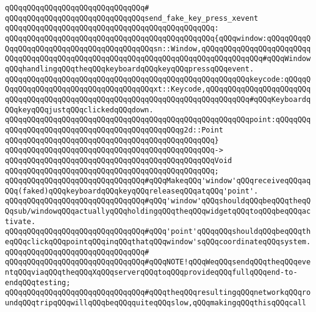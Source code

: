\verb|qQQqqQQqqQQqqQQqqQQqqQQqqQQqqQQq#|\newline
\verb|qQQqqQQqqQQqqQQqqQQqqQQqqQQqqQQqsend_fake_key_press_xevent|\newline
\verb|qQQqqQQqqQQqqQQqqQQqqQQqqQQqqQQqqQQqqQQqqQQqqQQq:|\newline
\verb|qQQqqQQqqQQqqQQqqQQqqQQqqQQqqQQqqQQqqQQqqQQqqQQq{qQQqwindow:qQQqqQQqqQQqqQQqqQQqqQQqqQQqqQQqqQQqqQQqqQQqsn::Window,qQQqqQQqqQQqqQQqqQQqqQQqqQQqqQQqqQQqqQQqqQQqqQQqqQQqqQQqqQQqqQQqqQQqqQQqqQQqqQQqqQQq#qQQqWindowqQQqhandlingqQQqtheqQQqkeyboardqQQqkeyqQQqpressqQQqevent.|\newline
\verb|qQQqqQQqqQQqqQQqqQQqqQQqqQQqqQQqqQQqqQQqqQQqqQQqqQQqqQQqkeycode:qQQqqQQqqQQqqQQqqQQqqQQqqQQqqQQqqQQqqQQqxt::Keycode,qQQqqQQqqQQqqQQqqQQqqQQqqQQqqQQqqQQqqQQqqQQqqQQqqQQqqQQqqQQqqQQqqQQqqQQqqQQqqQQq#qQQqKeyboardqQQqkeyqQQqjustqQQqclickedqQQqdown.|\newline
\verb|qQQqqQQqqQQqqQQqqQQqqQQqqQQqqQQqqQQqqQQqqQQqqQQqqQQqqQQqpoint:qQQqqQQqqQQqqQQqqQQqqQQqqQQqqQQqqQQqqQQqqQQqqQQqg2d::Point|\newline
\verb|qQQqqQQqqQQqqQQqqQQqqQQqqQQqqQQqqQQqqQQqqQQqqQQq}|\newline
\verb|qQQqqQQqqQQqqQQqqQQqqQQqqQQqqQQqqQQqqQQqqQQqqQQq->|\newline
\verb|qQQqqQQqqQQqqQQqqQQqqQQqqQQqqQQqqQQqqQQqqQQqqQQqVoid|\newline
\verb|qQQqqQQqqQQqqQQqqQQqqQQqqQQqqQQqqQQqqQQqqQQqqQQq;|\newline
\newline
\verb|qQQqqQQqqQQqqQQqqQQqqQQqqQQqqQQq#qQQqMakeqQQq'window'qQQqreceiveqQQqaqQQq(faked)qQQqkeyboardqQQqkeyqQQqreleaseqQQqatqQQq'point'.|\newline
\verb|qQQqqQQqqQQqqQQqqQQqqQQqqQQqqQQq#qQQq'window'qQQqshouldqQQqbeqQQqtheqQQqsub/windowqQQqactuallyqQQqholdingqQQqtheqQQqwidgetqQQqtoqQQqbeqQQqactivate.|\newline
\verb|qQQqqQQqqQQqqQQqqQQqqQQqqQQqqQQq#qQQq'point'qQQqqQQqshouldqQQqbeqQQqtheqQQqclickqQQqpointqQQqinqQQqthatqQQqwindow'sqQQqcoordinateqQQqsystem.|\newline
\verb|qQQqqQQqqQQqqQQqqQQqqQQqqQQqqQQq#|\newline
\verb|qQQqqQQqqQQqqQQqqQQqqQQqqQQqqQQq#qQQqNOTE!qQQqWeqQQqsendqQQqtheqQQqeventqQQqviaqQQqtheqQQqXqQQqserverqQQqtoqQQqprovideqQQqfullqQQqend-to-endqQQqtesting;|\newline
\verb|qQQqqQQqqQQqqQQqqQQqqQQqqQQqqQQq#qQQqtheqQQqresultingqQQqnetworkqQQqroundqQQqtripqQQqwillqQQqbeqQQqquiteqQQqslow,qQQqmakingqQQqthisqQQqcall|\newline
